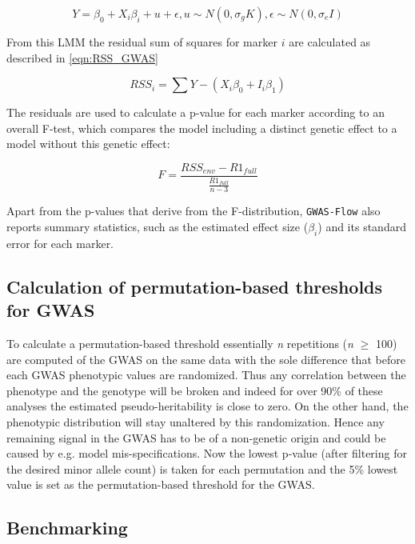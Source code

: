 \begin{equation}
Y = \beta_{0} + X_i\beta_i + u + \epsilon, u \sim N(0,\sigma_gK), \epsilon \sim N(0,\sigma_e I )
\label{eqn:LMM GWAS}
\end{equation}

\noindent
From this LMM the residual sum of squares for marker $i$ are calculated as described in
\ref{eqn:RSS_GWAS}

\begin{equation}
RSS_{i} = \sum{Y - (X_{i}\beta_{0}  + I_{i}\beta_{1})}
\label{eqn:RSS_GWAS}
\end{equation}

\noindent
The residuals are used to calculate a p-value for each marker according to an overall
F-test, which compares the model including a distinct genetic effect to a model without
this genetic effect:

\begin{equation}
 F = \frac{RSS_{env} - R1_{full} }{\frac{R1_{full}}{n-3}}
 \label{F_test}
\end{equation}

\noindent
Apart from the p-values that derive from the F-distribution, \texttt{GWAS-Flow} also
reports summary statistics, such as the estimated effect size ($\beta_i$) and its standard
error for each marker.

\subsection{Calculation of permutation-based thresholds for GWAS}

To calculate a permutation-based threshold essentially \textit{n} repetitions (\textit{n}
$\geq$ 100) are computed of the GWAS on the same data with the sole difference that before
each GWAS phenotypic values are randomized. Thus any correlation between the phenotype and
the genotype will be broken and indeed for over 90\% of these analyses the estimated
pseudo-heritability is close to zero. On the other hand, the phenotypic distribution will
stay unaltered by this randomization. Hence any remaining signal in the GWAS has to be of
a non-genetic origin and could be caused by e.g. model mis-specifications. Now the lowest
p-value (after filtering for the desired minor allele count) is taken for each permutation
and the 5\% lowest value is set as the permutation-based threshold for the GWAS.

\subsection{Benchmarking}

